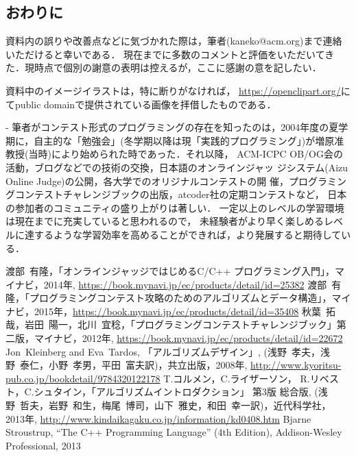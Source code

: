 \documentclass[dvipdfmx,report]{jsbook}
\begin{document}
\begin{versionoutside}
\chapter{おわりに}
資料内の誤りや改善点などに気づかれた際は，筆者(kaneko@acm.org)まで連絡いただけると幸いである．
現在までに多数のコメントと評価をいただいてきた．現時点で個別の謝意の表明は控えるが，ここに感謝の意を記したい．

資料中のイメージイラストは，特に断りがなければ，
\url{https://openclipart.org/}にてpublic domainで提供されている画像を拝借したものである．

\vfill

\begin{itembox}[r]{-}
筆者がコンテスト形式のプログラミングの存在を知ったのは，2004年度の夏学
期に，自主的な「勉強会」(冬学期以降は現「実践的プログラミング」)が増原准教授(当時)により始められた時であった．それ以降，
ACM-ICPC OB/OG会の活動，ブログなどでの技術の交換，日本語のオンラインジャッ
ジシステム(Aizu Online Judge)の公開，各大学でのオリジナルコンテストの開
催，プログラミングコンテストチャレンジブックの出版，atcoder社の定期コンテストなど，
日本の参加者のコミュニティの盛り上がりは著しい．
一定以上のレベルの学習環境は現在までに充実していると思われるので，
未経験者がより早く楽しめるレベルに達するような学習効率を高めることができれば，より発展すると期待している．
\end{itembox}
\end{versionoutside}


\appendix

 

\begin{thebibliography}{99}
 渡部~有隆，「オンラインジャッジではじめるC/C++
プログラミング入門」，マイナビ，2014年, \url{https://book.mynavi.jp/ec/products/detail/id=25382}
 渡部~有隆，「プログラミングコンテスト攻略のためのアルゴリズムとデータ構造」，マイナビ，2015年，\url{https://book.mynavi.jp/ec/products/detail/id=35408}
 秋葉~拓哉，岩田~陽一，北川~宜稔，「プログラミングコンテストチャレンジブック」第二版，マイナビ，2012年, \url{https://book.mynavi.jp/ec/products/detail/id=22672}
 Jon~Kleinberg and Eva~Tardos, 
「アルゴリズムデザイン」, (浅野~孝夫，浅野~泰仁，小野~孝男，平田~富夫訳)，共立出版，2008年, \url{http://www.kyoritsu-pub.co.jp/bookdetail/9784320122178}
 T.コルメン，C.ライザーソン，
R.リベスト，C.シュタイン，「アルゴリズムイントロダクション」
  第3版 総合版, 
(浅野~哲夫，岩野~和生，梅尾~博司，山下~雅史，和田~幸一訳)，近代科学社，
  2013年, 
\url{http://www.kindaikagaku.co.jp/information/kd0408.htm}
  Bjarne Stroustrup, ``The C++ Programming Language'' (4th Edition),
  Addison-Wesley Professional, 2013
\end{thebibliography}


\printindex
\end{document}

